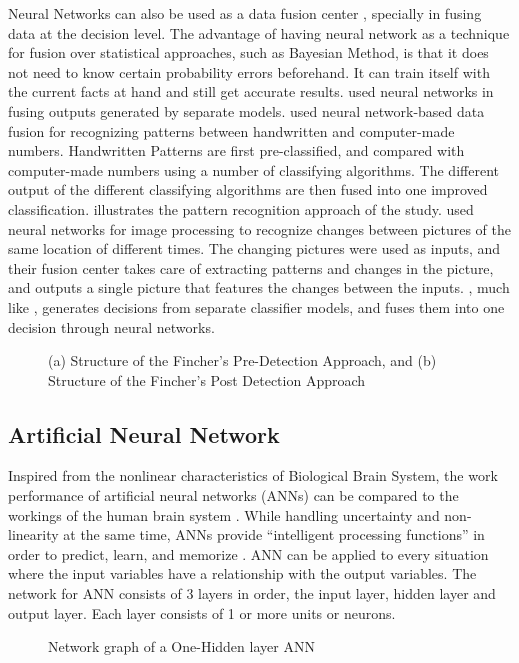 Neural Networks can also be used as a data fusion center , specially in fusing data at the decision level. The advantage of having neural network as a technique for fusion over statistical approaches, such as Bayesian Method, is that it does not need to know certain probability errors beforehand. It can train itself with the current facts at hand and still get accurate results.  used neural networks in fusing outputs generated by separate models.  used neural network-based data fusion for recognizing patterns between handwritten and computer-made numbers. Handwritten Patterns are first pre-classified, and compared with computer-made numbers using a number of classifying algorithms. The different output of the different classifying algorithms are then fused into one improved classification.  illustrates the pattern recognition approach of the study.  used neural networks for image processing to recognize changes between pictures of the same location of different times. The changing pictures were used as inputs, and their fusion center takes care of extracting patterns and changes in the picture, and outputs a single picture that features the changes between the inputs. , much like , generates decisions from separate classifier models, and fuses them into one decision through neural networks. 

\begin{figure}[h]
   \centering
   \captionsetup{justification=centering}
   \caption{(a) Structure of the Fincher’s Pre-Detection Approach, and (b) Structure of the Fincher’s Post Detection Approach}
   \label{fig:fincher_approach}
\end{figure}

\subsection{Artificial Neural Network}
Inspired from the nonlinear characteristics of Biological Brain System, the work performance of artificial neural networks (ANNs) can be compared to the workings of the human brain system . While handling uncertainty and non-linearity at the same time, ANNs provide “intelligent processing functions” in order to predict, learn, and memorize . 
ANN can be applied to every situation where the input variables have a relationship with the output variables. The network for ANN consists of 3 layers in order, the input layer, hidden layer and output layer. Each layer consists of 1 or more units or neurons. 
\begin{figure}[h]
	\centering
	\captionsetup{justification=centering}
	\caption{Network graph of a One-Hidden layer ANN}
	\label{fig:annexample}
\end{figure}

